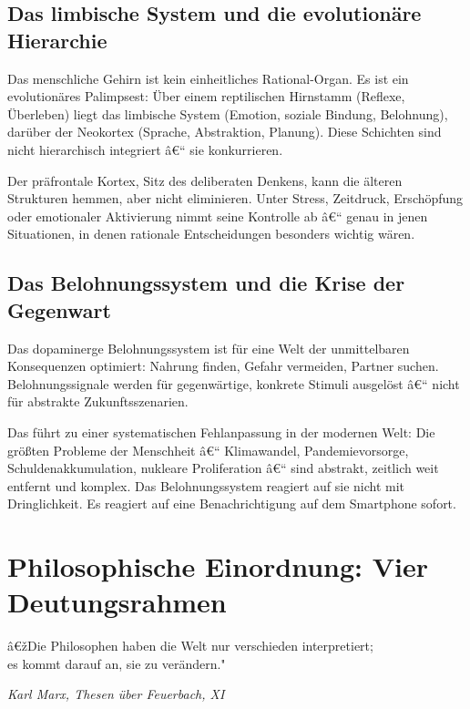 ﻿\documentclass[12pt, a4paper]{article}
\begin{document}
\subsection{Das limbische System und die evolutionäre Hierarchie}

Das menschliche Gehirn ist kein einheitliches Rational-Organ. Es ist ein
evolutionäres Palimpsest: Über einem reptilischen Hirnstamm (Reflexe, Überleben)
liegt das limbische System (Emotion, soziale Bindung, Belohnung), darüber der
Neokortex (Sprache, Abstraktion, Planung). Diese Schichten sind nicht hierarchisch
integriert â€“ sie konkurrieren.

Der präfrontale Kortex, Sitz des deliberaten Denkens, kann die älteren Strukturen
hemmen, aber nicht eliminieren. Unter Stress, Zeitdruck, Erschöpfung oder
emotionaler Aktivierung nimmt seine Kontrolle ab â€“ genau in jenen Situationen,
in denen rationale Entscheidungen besonders wichtig wären.

\subsection{Das Belohnungssystem und die Krise der Gegenwart}

Das dopaminerge Belohnungssystem ist für eine Welt der unmittelbaren Konsequenzen
optimiert: Nahrung finden, Gefahr vermeiden, Partner suchen. Belohnungssignale
werden für gegenwärtige, konkrete Stimuli ausgelöst â€“ nicht für abstrakte
Zukunftsszenarien.

Das führt zu einer systematischen Fehlanpassung in der modernen Welt:
Die größten Probleme der Menschheit â€“ Klimawandel, Pandemievorsorge,
Schuldenakkumulation, nukleare Proliferation â€“ sind abstrakt, zeitlich weit
entfernt und komplex. Das Belohnungssystem reagiert auf sie nicht mit Dringlichkeit.
Es reagiert auf eine Benachrichtigung auf dem Smartphone sofort.

\section{Philosophische Einordnung: Vier Deutungsrahmen}

\epigraph{â€žDie Philosophen haben die Welt nur verschieden interpretiert;\\
es kommt darauf an, sie zu verändern."}{\textit{Karl Marx, Thesen über Feuerbach, XI}}
\end{document}
